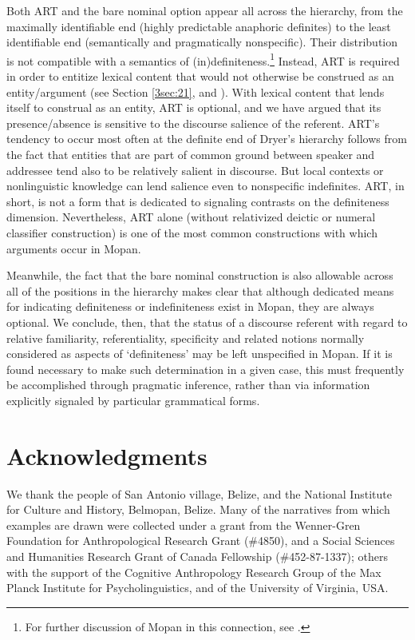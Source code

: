 \documentclass[output=paper]{langsci/langscibook}
\begin{document}
Both ART and the bare nominal option appear all across the hierarchy, from the maximally identifiable end (highly predictable anaphoric definites) to the least identifiable end (semantically and pragmatically nonspecific). Their distribution is not compatible with a semantics of (in)definiteness.\footnote{{For further discussion of Mopan in this connection, see \cite{contini:morava:danziger:fc}.}} Instead, ART is required in order to entitize lexical content that would not otherwise be construed as an entity/argument (see Section \ref{3sec:21}, and \citealt{contini:morava:danziger:fc}).  With lexical content that lends itself to construal as an entity, ART is optional, and we have argued that its presence/absence is sensitive to the discourse salience of the referent.  ART's tendency to occur most often at the definite end of Dryer's hierarchy follows from the fact that entities that are part of common ground between speaker and addressee tend also to be relatively salient in discourse.  But local contexts or nonlinguistic knowledge can lend salience even to nonspecific indefinites. ART, in short, is not a form that is dedicated to signaling contrasts on the definiteness dimension.  Nevertheless, ART alone (without relativized deictic or numeral classifier construction) is one of the most common constructions with which arguments occur in Mopan.

Meanwhile, the fact that the bare nominal construction is also allowable across all of the positions in the hierarchy makes clear that although  dedicated means for indicating definiteness or indefiniteness exist in Mopan, they are always optional. We conclude, then, that the status of a discourse referent with regard to relative familiarity, referentiality, specificity and related notions normally considered as aspects of `definiteness' may be left unspecified in Mopan.  If it is found necessary to make such determination in a given case, this must frequently be accomplished through pragmatic inference, rather than via information explicitly signaled by particular grammatical forms.

\section*{Acknowledgments}
We thank the people of San Antonio village, Belize, and the National Institute for Culture and History, Belmopan, Belize. Many of the narratives from which examples are drawn were collected under a grant from the Wenner-Gren Foundation for Anthropological Research Grant (\#4850), and a Social Sciences and Humanities Research Grant of Canada Fellowship (\#452-87-1337); others with the support of the Cognitive Anthropology Research Group of the Max Planck Institute for Psycholinguistics, and of the University of Virginia, USA. 
\end{document}

